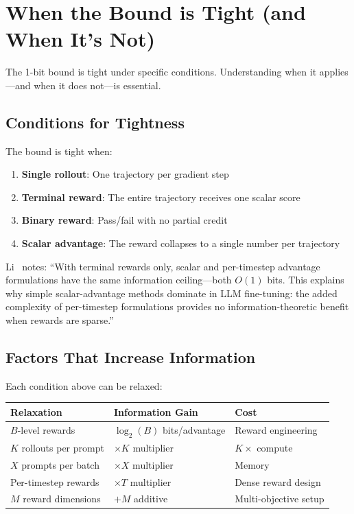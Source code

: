 \documentclass[11pt,a4paper]{article}
\theoremstyle{definition}
\theoremstyle{remark}
\begin{document}
\section{When the Bound is Tight (and When It's Not)}

The 1-bit bound is tight under specific conditions. Understanding when it applies---and when it does not---is essential.

\subsection{Conditions for Tightness}

The bound is tight when:
\begin{enumerate}
    \item \textbf{Single rollout}: One trajectory per gradient step
    \item \textbf{Terminal reward}: The entire trajectory receives one scalar score
    \item \textbf{Binary reward}: Pass/fail with no partial credit
    \item \textbf{Scalar advantage}: The reward collapses to a single number per trajectory
\end{enumerate}

Li~\cite{li2025info} notes: ``With terminal rewards only, scalar and per-timestep advantage formulations have the same information ceiling---both $O(1)$ bits. This explains why simple scalar-advantage methods dominate in LLM fine-tuning: the added complexity of per-timestep formulations provides no information-theoretic benefit when rewards are sparse.''

\subsection{Factors That Increase Information}

Each condition above can be relaxed:

\begin{center}
\begin{tabular}{@{}p{4cm}p{4cm}p{4cm}@{}}
\toprule
\textbf{Relaxation} & \textbf{Information Gain} & \textbf{Cost} \\
\midrule
$B$-level rewards & $\log_2(B)$ bits/advantage & Reward engineering \\
$K$ rollouts per prompt & $\times K$ multiplier & $K\times$ compute \\
$X$ prompts per batch & $\times X$ multiplier & Memory \\
Per-timestep rewards & $\times T$ multiplier & Dense reward design \\
$M$ reward dimensions & $+M$ additive & Multi-objective setup \\
\bottomrule
\end{tabular}
\end{center}
\end{document}
